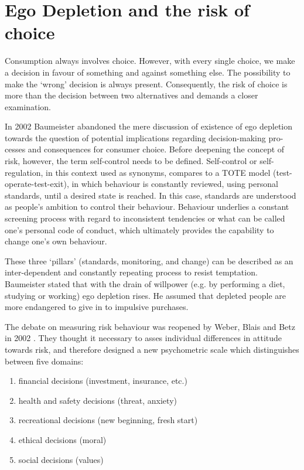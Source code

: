 \section{Ego Depletion and the risk of choice}
Consumption always involves choice. However, with every single choice, we make a decision in favour of something and against something else. The possibility to make the ‘wrong’ decision is always present. Consequently, the risk of choice is more than the decision between two alternatives and demands a closer examination.\par
In 2002 Baumeister \citep{baumeister2002yielding} abandoned the mere discussion of existence of ego depletion towards the question of potential implications regarding decision-making pro-cesses and consequences for consumer choice. Before deepening the concept of risk, however, the term self-control needs to be defined. Self-control or self-regulation, in this context used as synonyms, compares to a TOTE model (test-operate-test-exit), in which behaviour is constantly reviewed, using personal standards, until a desired state is reached. In this case, standards are understood as people’s ambition to control their behaviour. Behaviour underlies a constant screening process with regard to inconsistent tendencies or what can be called one’s personal code of conduct, which ultimately provides the capability to change one’s own behaviour.\par
These three ‘pillars’ (standards, monitoring, and change) can be described as an inter-dependent and constantly repeating process to resist temptation. Baumeister stated that with the drain of willpower (e.g. by performing a diet, studying or working) ego depletion rises. He assumed that depleted people are more endangered to give in to impulsive purchases. \par
The debate on measuring risk behaviour was reopened by Weber, Blais and Betz in 2002 \citep{weber2002domain}. They thought it necessary to asses individual differences in attitude towards risk, and therefore designed a new psychometric scale which distinguishes between five domains: 
\begin{enumerate}[1.]
	\item financial decisions (investment, insurance, etc.)
	\item health and safety decisions (threat, anxiety)
	\item recreational decisions (new beginning, fresh start)
	\item ethical decisions (moral) 
	\item social decisions (values)
\end{enumerate}\
